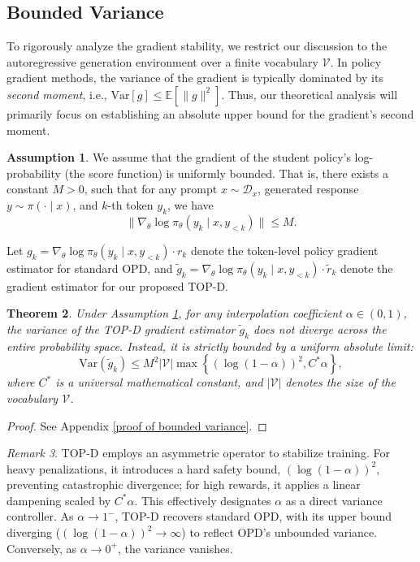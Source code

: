 \documentclass{article}
\theoremstyle{plain}
\newtheorem{theorem}{Theorem}[section]
\theoremstyle{definition}
\newtheorem{assumption}[theorem]{Assumption}
\theoremstyle{remark}
\newtheorem{remark}[theorem]{Remark}
\begin{document}
\subsection{Bounded Variance}\label{Bounded Variance}
To rigorously analyze the gradient stability, we restrict our discussion to the autoregressive generation environment over a finite vocabulary $\mathcal{V}$. In policy gradient methods, the variance of the gradient is typically dominated by its \textit{second moment}, i.e., $\mathrm{Var}\left[g\right]\leq\mathbb{E}\left[\lVert g\rVert^2\right]$. Thus, our theoretical analysis will primarily focus on establishing an absolute upper bound for the gradient's second moment.
\begin{assumption}\label{assumption 1}
	We assume that the gradient of the student policy's log-probability (the score function) is uniformly bounded. That is, there exists a constant $M>0$, such that for any prompt $x\sim\mathcal{D}_x$, generated response $y\sim\pi(\cdot\mid x)$, and $k$-th token $y_k$, we have
	\begin{equation}
		\lVert\nabla_{\theta}\log\pi_{\theta}(y_k\mid x,y_{<k})\rVert\leq M.
	\end{equation}
\end{assumption}
Let $g_k=\nabla_{\theta}\log\pi_{\theta}(y_k\mid x,y_{<k})\cdot r_k$ denote the token-level policy gradient estimator for standard OPD, and $\tilde{g}_k=\nabla_{\theta}\log\pi_{\theta}(y_k\mid x,y_{<k})\cdot\tilde{r}_k$ denote the gradient estimator for our proposed TOP-D.
\begin{theorem}\label{bounded variance}
	Under Assumption \ref{assumption 1}, for any interpolation coefficient $\alpha\in(0,1)$, the variance of the TOP-D gradient estimator $\tilde{g}_k$ does not diverge across the entire probability space. Instead, it is strictly bounded by a uniform absolute limit:
	\begin{equation}
		\mathrm{Var}(\tilde{g}_k)\leq M^2\lvert\mathcal{V}\rvert\max\left\{\left(\log(1-\alpha)\right)^2, C^*\alpha\right\},
	\end{equation}
	where $C^*$ is a universal mathematical constant, and $\lvert\mathcal{V}\rvert$ denotes the size of the vocabulary $\mathcal{V}$.
\end{theorem}
\begin{proof}
	See Appendix \ref{proof of bounded variance}.
\end{proof}
\begin{remark}
	TOP-D employs an asymmetric operator to stabilize training. For heavy penalizations, it introduces a hard safety bound, $(\log(1-\alpha))^2$, preventing catastrophic divergence; for high rewards, it applies a linear dampening scaled by $C^*\alpha$. This effectively designates $\alpha$ as a direct variance controller. As $\alpha \to 1^-$, TOP-D recovers standard OPD, with its upper bound diverging ($(\log(1-\alpha))^2 \to \infty$) to reflect OPD's unbounded variance. Conversely, as $\alpha \to 0^+$, the variance vanishes.
\end{remark}
\end{document}

